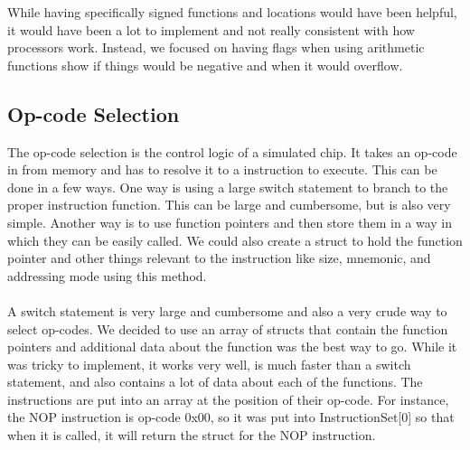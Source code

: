 \documentclass[conference]{IEEEtran}
\begin{document}
While having specifically signed functions and locations would have been helpful, it would have been a lot to implement and not really consistent with how processors work. Instead, we focused on having flags when using arithmetic functions show if things would be negative and when it would overflow.

\subsection{Op-code Selection}

The op-code selection is the control logic of a simulated chip. It takes an op-code in from memory and has to resolve it to a instruction to execute. This can be done in a few ways. One way is using a large switch statement to branch to the proper instruction function. This can be large and cumbersome, but is also very simple. Another way is to use function pointers and then store them in a way in which they can be easily called. We could also create a struct to hold the function pointer and other things relevant to the instruction like size, mnemonic, and addressing mode using this method.\\

\\

A switch statement is very large and cumbersome and also a very crude way to select op-codes. We decided to use an array of structs that contain the function pointers and additional data about the function was the best way to go. While it was tricky to implement, it works very well, is much faster than a switch statement, and also contains a lot of data about each of the functions. The instructions are put into an array at the position of their op-code. For instance, the NOP instruction is op-code 0x00, so it was put into InstructionSet[0] so that when it is called, it will return the struct for the NOP instruction.
\end{document}
